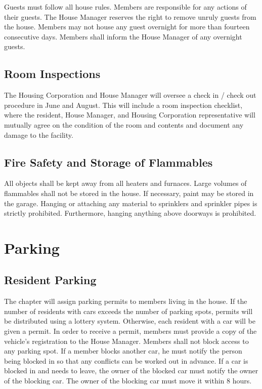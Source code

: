 Guests must follow all house rules.
Members are responsible for any actions of their guests.
The House Manager reserves the right to remove unruly guests from the house.
Members may not house any guest overnight for more than fourteen consecutive
days.
Members shall inform the House Manager of any overnight guests.

\subsection{Room Inspections}

The Housing Corporation and House Manager will oversee a check in / check out
procedure in June and August.  This will include a room inspection checklist,
where the resident, House Manager, and Housing Corporation representative will
mutually agree on the condition of the room and contents and document any
damage to the facility.

\subsection{Fire Safety and Storage of Flammables}

All objects shall be kept away from all heaters and furnaces.
Large volumes of flammables shall not be stored in the house.
If necessary, paint may be stored in the garage.
Hanging or attaching any material to sprinklers and sprinkler pipes is strictly
prohibited.
Furthermore, hanging anything above doorways is prohibited.

\section{Parking}

\subsection{Resident Parking}
\label{sec:resident-parking}

The chapter will assign parking permits to members living in the house.
If the number of residents with cars exceeds the number of parking spots,
permits will be distributed using a lottery system.
Otherwise, each resident with a car will be given a permit.
In order to receive a permit, members must provide a copy of the vehicle’s
registration to the House Manager.
Members shall not block access to any parking spot.
If a member blocks another car, he must notify the person being blocked in so
that any conflicts can be worked out in advance.
If a car is blocked in and needs to leave, the owner of the blocked car must
notify the owner of the blocking car.
The owner of the blocking car must move it within 8 hours.


